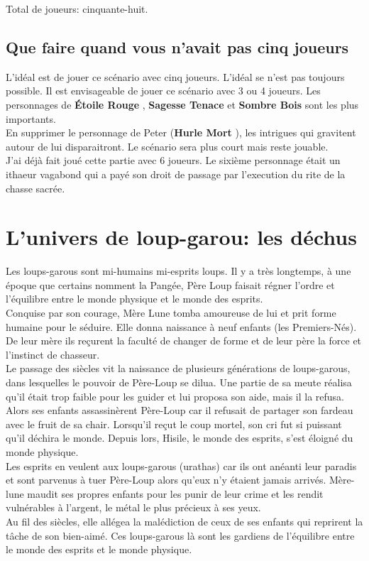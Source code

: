 \documentclass[oneside,12pt]{book}
\newcommand{\Lynn}{\textbf{Étoile Rouge} }
\newcommand{\Jessica}{\textbf{Sagesse Tenace} }
\newcommand{\Peter}{\textbf{Hurle Mort} }
\newcommand{\Leonard}{\textbf{Sombre Bois} }
\begin{document}
\begin{flushleft}
    Total de joueurs: cinquante-huit.
    
        \subsection{Que faire quand vous n'avait pas cinq joueurs}
    L'idéal est de jouer ce scénario avec cinq joueurs. L'idéal se n'est pas toujours possible. Il est envisageable de
    jouer ce scénario avec 3 ou 4 joueurs. Les personnages de \Lynn, \Jessica et \Leonard sont les plus importants.\\
    En supprimer le personnage de Peter (\Peter), les intrigues qui gravitent autour de lui disparaitront. Le scénario sera plus court mais reste jouable. \\
    J'ai déjà fait joué cette partie avec 6 joueurs. Le sixième personnage était un ithaeur vagabond qui a payé son droit de passage par l'execution du rite de la chasse sacrée.


        \section{L'univers de loup-garou: les déchus}
       Les loups-garous sont mi-humains mi-esprits loups. 
       Il y a très longtemps, à une époque que certains nomment la Pangée, 
       Père Loup faisait régner l'ordre et l’équilibre entre le monde physique et le monde des esprits.\\ 
       Conquise par son courage, Mère Lune tomba amoureuse de lui et prit forme humaine pour le séduire. 
       Elle donna naissance à neuf enfants (les Premiers-Nés). 
       De leur mère ils reçurent la faculté de changer de forme et de leur père la force et l'instinct de chasseur.\\ 
       Le passage des siècles vit la naissance de plusieurs générations de loups-garous, 
       dans lesquelles le pouvoir de Père-Loup se dilua. 
       Une partie de sa meute réalisa qu'il était trop faible pour les guider et lui proposa son aide, mais il la refusa. Alors ses enfants assassinèrent Père-Loup car il refusait de partager son fardeau avec le fruit de sa chair. Lorsqu’il reçut le coup mortel, son cri fut si puissant qu’il déchira le monde. Depuis lors, Hisile, le monde des esprits, s’est éloigné du monde physique.\\ Les esprits en veulent aux loups-garous (urathas) car ils ont anéanti leur paradis et sont parvenus à tuer Père-Loup alors qu’eux n’y étaient jamais arrivés. Mère-lune maudit ses propres enfants pour les punir de leur crime et les rendit vulnérables à l'argent, le métal le plus précieux à ses yeux.\\ 
       Au fil des siècles, elle allégea la malédiction de ceux de ses enfants qui reprirent la tâche de son bien-aimé. 
       Ces loups-garous là sont les gardiens de l’équilibre entre le monde des esprits et le monde physique.  \\

\end{flushleft}
\end{document}
